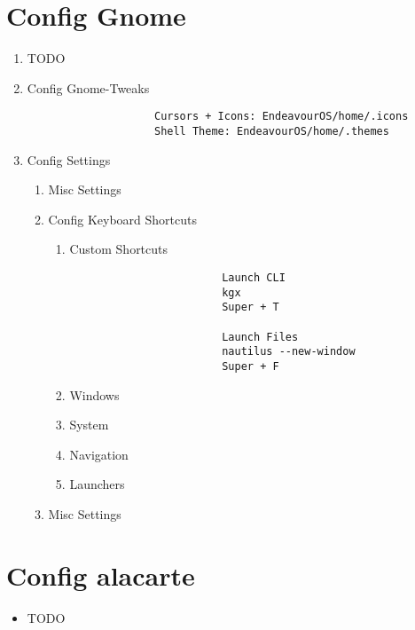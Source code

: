 \documentclass[12pt]{article}
\begin{document}
    \section{Config Gnome}\label{sec:config-gnome}
        \begin{enumerate}
            \item TODO
            \item Config Gnome-Tweaks
            \begin{enumerate}
                \begin{verbatim}
                    Cursors + Icons: EndeavourOS/home/.icons
                    Shell Theme: EndeavourOS/home/.themes
                \end{verbatim}
            \end{enumerate}
            \item Config Settings
            \begin{enumerate}
                \item Misc Settings
                \item Config Keyboard Shortcuts
                \begin{enumerate}
                    \item Custom Shortcuts
                    \begin{verbatim}
                        Launch CLI
                        kgx
                        Super + T

                        Launch Files
                        nautilus --new-window
                        Super + F
                    \end{verbatim}
                    \item Windows
                    \item System
                    \item Navigation
                    \item Launchers
                \end{enumerate}
                \item Misc Settings
            \end{enumerate}
        \end{enumerate}

    \section{Config alacarte}\label{sec:config-alacarte}
        \begin{itemize}
            \item TODO
        \end{itemize}
\end{document}
